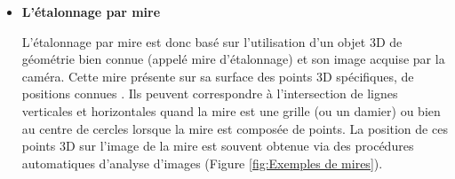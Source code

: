   \begin{itemize}[label={\Huge$\star$}]
  	 
  \item \textbf{L’étalonnage par mire}
  
  L’étalonnage par mire est donc basé sur l’utilisation d’un objet 3D de géométrie bien connue (appelé mire d’étalonnage) et son image acquise par la caméra. Cette mire présente sur sa surface des points 3D spécifiques, de positions connues . Ils peuvent correspondre à l’intersection de lignes verticales et horizontales quand la mire est une grille (ou un damier) ou bien au centre de cercles lorsque la mire est composée de points. La position de ces points 3D sur l’image de la mire est souvent obtenue via des procédures automatiques d’analyse d’images\cite{faugeras_three-dimensional_1993,eikosim_etalonnage_2021}  (Figure \ref{fig:Exemples de mires}).
  

\end{itemize}
